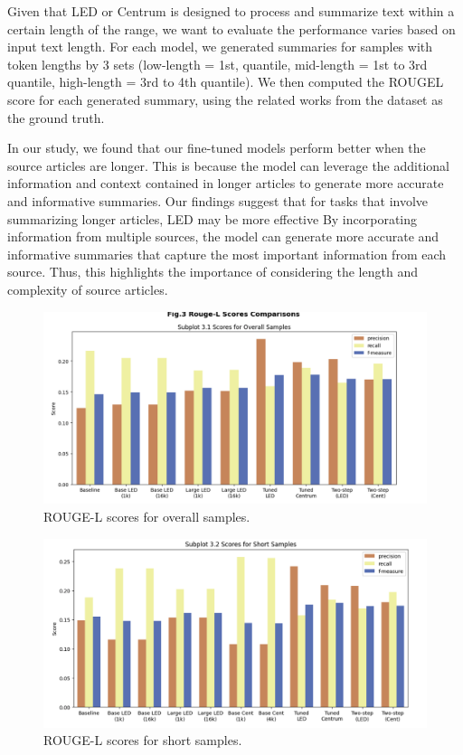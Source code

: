 \documentclass[12pt, twocolumn]{article}
\numberwithin{equation}{section}
\begin{document}
Given that LED or Centrum is designed to process and summarize text within a certain length of the range, we want to evaluate the performance varies based on input text length. For each model, we generated summaries for samples with token lengths by 3 sets (low-length = 1st, quantile, mid-length = 1st to 3rd quantile, high-length = 3rd to 4th quantile). We then computed the ROUGEL score for each generated summary, using the related works from the dataset as the ground truth.

In our study, we found that our fine-tuned models perform better when the source articles are longer. This is because the model can leverage the additional information and context contained in longer articles to generate more accurate and informative summaries. Our findings suggest that for tasks that involve summarizing longer articles, LED may be more effective By incorporating information from multiple sources, the model can generate more accurate and informative summaries that capture the most important information from each source. Thus, this highlights the importance of considering the length and complexity of source articles.

\begin{figure}
    \includegraphics[width=\textwidth]{overall.png}
    \caption{ROUGE-L scores for overall samples.}
    \label{fig:overall}
\end{figure}

\begin{figure}
    \includegraphics[width=\textwidth]{short.png}
    \caption{ROUGE-L scores for short samples.}
    \label{fig:short}
\end{figure}
\end{document}
